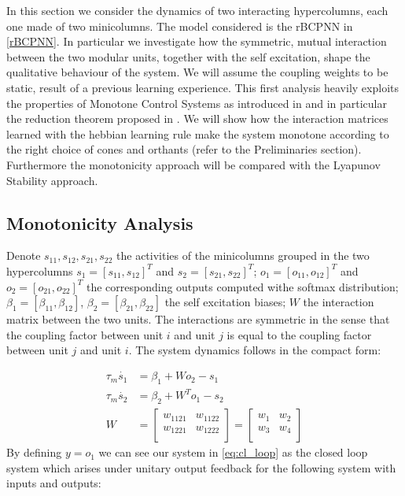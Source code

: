 In this section we consider the dynamics of two interacting hypercolumns, each one made of two minicolumns. The model considered is the rBCPNN in \cref{rBCPNN}. In particular we investigate how the symmetric, mutual interaction between the two modular units, together with the self excitation, shape the qualitative behaviour of the system. We will assume the coupling  weights to be static, result of a previous learning experience. This first analysis heavily exploits the properties of Monotone Control Systems as introduced in \cite{angeli2003monotone} and in particular the reduction theorem proposed in \cite{enciso2005monotone}. We will show how the interaction matrices learned with the hebbian learning rule make the system monotone according to the right choice of cones and orthants (refer to the Preliminaries section). Furthermore the monotonicity approach will be compared with the Lyapunov Stability approach.

\subsection{Monotonicity Analysis}
Denote $s_{11}, s_{12}, s_{21}, s_{22}$ the activities of the minicolumns grouped in the two hypercolumns $s_1 = [s_{11}, s_{12}]^T$ and $s_2 = [s_{21}, s_{22}]^T$;  $o_1 = [o_{11}, o_{12}]^T$ and $o_2 = [o_{21}, o_{22}]^T$ the corresponding outputs computed withe softmax distribution; $\beta_1 = [\beta_{11}, \beta_{12}]$, $\beta_2 = [\beta_{21}, \beta_{22}]$ the self excitation biases; $W$ the interaction matrix between the two units. The interactions are symmetric in the sense that the coupling factor between unit $i$ and unit $j$ is equal to the coupling factor between unit $j$ and unit $i$. The system dynamics follows in the compact form:

\begin{equation}
\begin{aligned}
\tau_m \dot{s_1} &= \beta_{1} + Wo_{2}-s_{1} \\
\tau_m \dot{s_2} &= \beta_{2} + W^{T}o_{1}-s_{2} \\
W & =
\begin{bmatrix}
 w_{1121} & w_{1122} \\
 w_{1221} & w_{1222} \\
\end{bmatrix} = 
\begin{bmatrix}
 w_{1} & w_{2} \\
 w_{3} & w_{4} \\
\end{bmatrix} 
\end{aligned}
\label{eq:cl_loop}
\end{equation}
By defining $y = o_1$ we can see our system in \eqref{eq:cl_loop} as the closed loop system which arises under unitary output feedback for the following system with inputs and outputs:

